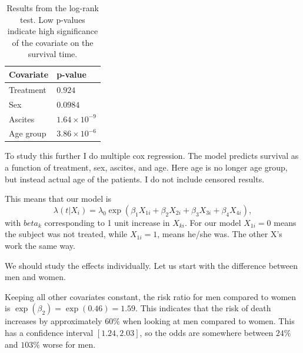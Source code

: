 \documentclass[a4paper]{article}
\begin{document}
\begin{table}[ht]
\begin{center}
\begin{tabular}{|l|l|}
   \hline
   Covariate&p-value\\
   \hline
   Treatment&$0.924$\\
   \hline
   Sex&$0.0984$\\
   \hline
   Ascites&$1.64\times10^{-9}$\\
   \hline
   Age group&$3.86\times10^{-6}$\\
   \hline
 \end{tabular}
\end{center}
 \caption{Results from the log-rank test. Low p-values indicate high significance of the covariate on the survival time.}
 \label{log-rank}
\end{table}

To study this further I do multiple cox regression. The model predicts survival as a function of treatment, sex, ascites, and age. Here age is no longer age group, but instead actual age of the patients. I do not include censored results.

This means that our model is
\begin{equation}
 \lambda(t|X_i) = \lambda_0\exp(\beta_1 X_{1i}+ \beta_2 X_{2i} + \beta_3 X_{3i} + \beta_4 X_{4i}),
\end{equation}
with $beta_k$ corresponding to 1 unit increase in $X_{ki}$. For our model $X_{1i} = 0$ means the subject was not treated, while $X_{1i} = 1$, means he/she was. The other X's work the same way. 

We should study the effects individually. Let us start with the difference between men and women.

Keeping all other covariates constant, the risk ratio for men compared to women is $\exp(\beta_2)=\exp(0.46) = 1.59$. This indicates that the risk of death increases by approximately $60\%$ when looking at men compared to women. This has a confidence interval $[1.24 , 2.03]$, so the odds are somewhere between $24\%$ and $103\%$ worse for men. 
\end{document}
